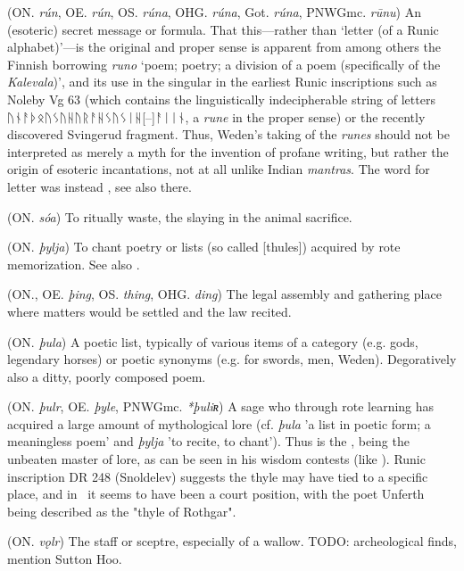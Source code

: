 \begin{itemize}
 (ON. \emph{rún}, OE. \emph{rún}, OS. \emph{rúna}, OHG. \emph{rúna}, Got. \emph{rúna}, PNWGmc. \emph{rūnu})
  An (esoteric) secret message or formula. That this—rather than ‘letter (of a Runic alphabet)’—is the original and proper sense is apparent from among others the Finnish borrowing \emph{runo} ‘poem; poetry; a division of a poem (specifically of the \emph{Kalevala})’, and its use in the singular in the earliest Runic inscriptions such as Noleby Vg 63 (which contains the linguistically indecipherable string of letters {ᚢᚾᚨᚦᛟᚢᛊᚢᚺᚢᚱᚨᚺᛊᚢᛊᛁᚺ[--]ᚨᛁᛁᚾ}, a \emph{rune} in the proper sense) or the recently discovered Svingerud fragment. Thus, Weden’s taking of the \emph{runes} should not be interpreted as merely a myth for the invention of profane writing, but rather the origin of esoteric incantations, not at all unlike Indian \emph{mantras}.
  The word for letter was instead , see also there.

 (ON. \emph{sóa})
  To ritually waste, the slaying in the animal sacrifice.

 (ON. \emph{þylja})
  To chant poetry or lists (so called [thules]) acquired by rote memorization. See also .

 (ON., OE. \emph{þing}, OS. \emph{thing}, OHG. \emph{ding})
  The legal assembly and gathering place where matters would be settled and the law recited.

 (ON. \emph{þula})
  A poetic list, typically of various items of a category (e.g. gods, legendary horses) or poetic synonyms (e.g. for swords, men, Weden). Degoratively also a ditty, poorly composed poem.

 (ON. \emph{þulr}, OE. \emph{þyle}, PNWGmc. \emph{*þuliʀ})
  A sage who through rote learning has acquired a large amount of mythological lore (cf. \emph{þula} 'a list in poetic form; a meaningless poem' and \emph{þylja} 'to recite, to chant'). Thus  is the , being the unbeaten master of lore, as can be seen in his wisdom contests (like \Vafthrudnismal). Runic inscription DR 248 (Snoldelev) suggests the thyle may have tied to a specific place, and in \Beowulf\ it seems to have been a court position, with the poet Unferth being described as the "thyle of Rothgar".

 (ON. \emph{vǫlr})
  The staff or sceptre, especially of a wallow. TODO: archeological finds, mention Sutton Hoo.


\end{itemize}
